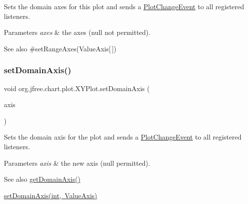 Sets the domain axes for this plot and sends a \mbox{\hyperlink{}{Plot\+Change\+Event}} to all registered listeners.


\begin{DoxyParams}{Parameters}
{\em axes} & the axes ({\ttfamily null} not permitted).\\
\hline
\end{DoxyParams}
\begin{DoxySeeAlso}{See also}
\#set\+Range\+Axes(\+Value\+Axis\mbox{[}$\,$\mbox{]}) 
\end{DoxySeeAlso}
\mbox{\label{classorg_1_1jfree_1_1chart_1_1plot_1_1_x_y_plot_a3107d21e7a027e58e84cd5e75293d4b5}} 
\subsubsection{\texorpdfstring{set\+Domain\+Axis()}{setDomainAxis()}\hspace{0.1cm}{\footnotesize\ttfamily [1/3]}}
{\footnotesize\ttfamily void org.\+jfree.\+chart.\+plot.\+X\+Y\+Plot.\+set\+Domain\+Axis (\begin{DoxyParamCaption}\item[{\mbox{\hyperlink{classorg_1_1jfree_1_1chart_1_1axis_1_1_value_axis}{Value\+Axis}}}]{axis }\end{DoxyParamCaption})}

Sets the domain axis for the plot and sends a \mbox{\hyperlink{}{Plot\+Change\+Event}} to all registered listeners.


\begin{DoxyParams}{Parameters}
{\em axis} & the new axis ({\ttfamily null} permitted).\\
\hline
\end{DoxyParams}
\begin{DoxySeeAlso}{See also}
\mbox{\hyperlink{classorg_1_1jfree_1_1chart_1_1plot_1_1_x_y_plot_a2c5e698142aa9597e1aa2d73bec69451}{get\+Domain\+Axis()}} 

\mbox{\hyperlink{classorg_1_1jfree_1_1chart_1_1plot_1_1_x_y_plot_a688e91cf072d5d4e54736212ccd81e1e}{set\+Domain\+Axis(int, Value\+Axis)}} 
\end{DoxySeeAlso}
\mbox{\label{classorg_1_1jfree_1_1chart_1_1plot_1_1_x_y_plot_a688e91cf072d5d4e54736212ccd81e1e}} 
